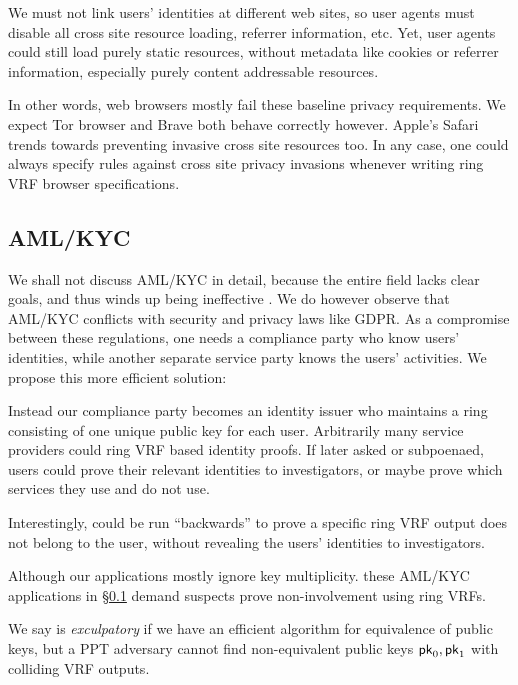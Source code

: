 We must not link users' identities at different web sites, so user agents
must disable all cross site resource loading, referrer information, etc.
Yet, user agents could still load purely static resources, without metadata
like cookies or referrer information, especially purely content addressable
resources.

In other words, web browsers mostly fail these baseline privacy requirements.
We expect Tor browser and Brave both behave correctly however.
Apple's Safari trends towards preventing invasive cross site resources too.  
In any case, one could always specify rules against cross site privacy invasions
whenever writing ring VRF browser specifications.


\subsection{AML/KYC}\label{subsec:AML_KYC}

We shall not discuss AML/KYC in detail, because the entire field lacks
clear goals, and thus winds up being ineffective
 \cite{doi:10.1080/25741292.2020.1725366}.
We do however observe that AML/KYC conflicts with security and privacy
laws like GDPR.  As a compromise between these regulations,
one needs a compliance party who know users' identities,
 while another separate service party knows the users' activities.
We propose this more efficient solution:

Instead our compliance party becomes an identity issuer who maintains
a ring \ctx consisting of one unique public key for each user.
Arbitrarily many service providers could ring VRF based identity proofs.
If later asked or subpoenaed, users could prove their relevant identities
to investigators, or maybe prove which services they use and do not use. 

Interestingly, \PedVRF could be run ``backwards'' to prove a specific
ring VRF output does not belong to the user, without revealing the users'
identities to investigators. 

Although our applications mostly ignore key multiplicity. 
these AML/KYC applications in \S\ref{subsec:AML_KYC} demand
suspects prove non-involvement using ring VRFs.

\begin{definition}\label{def:rvrf_exculpability}
We say \rVRF is {\em exculpatory} if we have an efficient algorithm
for equivalence of public keys, but a PPT adversary \adv cannot
find non-equivalent public keys $\mathsf{pk}_0,\mathsf{pk}_1$ with colliding VRF outputs.
\end{definition}

